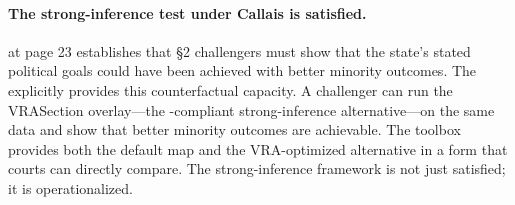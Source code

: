 \paragraph{The strong-inference test under Callais is satisfied.}
\callais{} at page 23 establishes that \S2 challengers must show that the
state's stated political goals could have been achieved with better minority
outcomes.
The \dia{} explicitly provides this counterfactual capacity.
A challenger can run the VRASection overlay---the \callais{}-compliant
strong-inference alternative---on the same data and show that better minority
outcomes are achievable.
The toolbox provides both the default map and the VRA-optimized alternative
in a form that courts can directly compare.
The \callais{} strong-inference framework is not just satisfied; it is operationalized.
